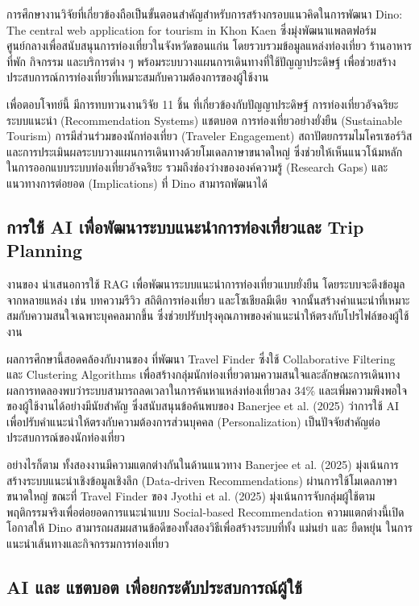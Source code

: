 การศึกษางานวิจัยที่เกี่ยวข้องถือเป็นขั้นตอนสำคัญสำหรับการสร้างกรอบแนวคิดในการพัฒนา Dino: The central web application for tourism in Khon Kaen ซึ่งมุ่งพัฒนาแพลตฟอร์มศูนย์กลางเพื่อสนับสนุนการท่องเที่ยวในจังหวัดขอนแก่น โดยรวบรวมข้อมูลแหล่งท่องเที่ยว ร้านอาหาร ที่พัก กิจกรรม และบริการต่าง ๆ พร้อมระบบวางแผนการเดินทางที่ใช้ปัญญาประดิษฐ์ เพื่อช่วยสร้างประสบการณ์การท่องเที่ยวที่เหมาะสมกับความต้องการของผู้ใช้งาน

เพื่อตอบโจทย์นี้ มีการทบทวนงานวิจัย 11 ชิ้น ที่เกี่ยวข้องกับปัญญาประดิษฐ์ การท่องเที่ยวอัจฉริยะ ระบบแนะนำ (Recommendation Systems) แชตบอต การท่องเที่ยวอย่างยั่งยืน (Sustainable Tourism) การมีส่วนร่วมของนักท่องเที่ยว (Traveler Engagement) สถาปัตยกรรมไมโครเซอร์วิส และการประเมินผลระบบวางแผนการเดินทางด้วยโมเดลภาษาขนาดใหญ่ ซึ่งช่วยให้เห็นแนวโน้มหลักในการออกแบบระบบท่องเที่ยวอัจฉริยะ รวมถึงช่องว่างขององค์ความรู้ (Research Gaps) และแนวทางการต่อยอด (Implications) ที่ Dino สามารถพัฒนาได้

\subsection{การใช้ AI เพื่อพัฒนาระบบแนะนำการท่องเที่ยวและ Trip Planning}

งานของ \textcite{banerjee2025} นำเสนอการใช้ RAG เพื่อพัฒนาระบบแนะนำการท่องเที่ยวแบบยั่งยืน โดยระบบจะดึงข้อมูลจากหลายแหล่ง เช่น บทความรีวิว สถิติการท่องเที่ยว และโซเชียลมีเดีย จากนั้นสร้างคำแนะนำที่เหมาะสมกับความสนใจเฉพาะบุคคลมากขึ้น ซึ่งช่วยปรับปรุงคุณภาพของคำแนะนำให้ตรงกับโปรไฟล์ของผู้ใช้งาน

ผลการศึกษานี้สอดคล้องกับงานของ \textcite{jyothi2025} ที่พัฒนา Travel Finder ซึ่งใช้ Collaborative Filtering และ Clustering Algorithms เพื่อสร้างกลุ่มนักท่องเที่ยวตามความสนใจและลักษณะการเดินทาง ผลการทดลองพบว่าระบบสามารถลดเวลาในการค้นหาแหล่งท่องเที่ยวลง 34\% และเพิ่มความพึงพอใจของผู้ใช้งานได้อย่างมีนัยสำคัญ ซึ่งสนับสนุนข้อค้นพบของ Banerjee et al. (2025) ว่าการใช้ AI เพื่อปรับคำแนะนำให้ตรงกับความต้องการส่วนบุคคล (Personalization) เป็นปัจจัยสำคัญต่อประสบการณ์ของนักท่องเที่ยว

อย่างไรก็ตาม ทั้งสองงานมีความแตกต่างกันในด้านแนวทาง Banerjee et al. (2025) มุ่งเน้นการสร้างระบบแนะนำเชิงข้อมูลเชิงลึก (Data-driven Recommendations) ผ่านการใช้โมเดลภาษาขนาดใหญ่ ขณะที่ Travel Finder ของ Jyothi et al. (2025) มุ่งเน้นการจับกลุ่มผู้ใช้ตามพฤติกรรมจริงเพื่อต่อยอดการแนะนำแบบ Social-based Recommendation ความแตกต่างนี้เปิดโอกาสให้ Dino สามารถผสมผสานข้อดีของทั้งสองวิธีเพื่อสร้างระบบที่ทั้ง แม่นยำ และ ยืดหยุ่น ในการแนะนำเส้นทางและกิจกรรมการท่องเที่ยว

\subsection{AI และ แชตบอต เพื่อยกระดับประสบการณ์ผู้ใช้}

